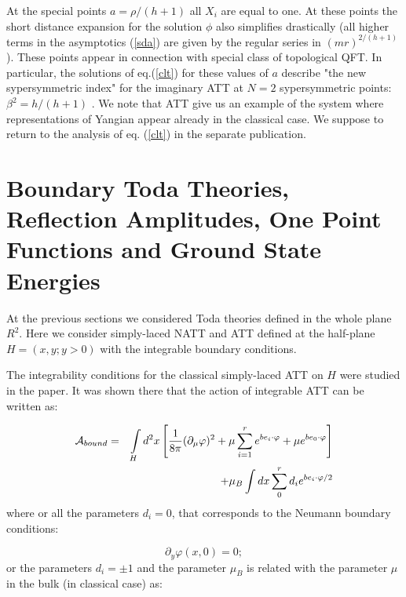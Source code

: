 \documentclass[a4paper,12pt]{article}
\begin{document}
At the special points $a=\rho /(h+1)$ all $X_i$ are equal to one. At these
points the short distance expansion for the solution $\phi $ also simplifies
drastically (all higher terms in the asymptotics (\ref{sda}) are given by
the regular series in $(mr)^{2/(h+1)}$). These points appear in connection
with special class of topological QFT. In particular, the solutions of 
eq.(\ref{clt}) for these values of $a$ describe "the new sypersymmetric index" 
\cite{CV} for the imaginary ATT at $N=2$ sypersymmetric points: $\beta
^2=h/(h+1)$ \cite{FLMW}. We note that ATT give us an example of the system 
where representations of Yangian appear already in the classical case. 
We suppose to return to the analysis of eq. 
(\ref{clt}) in the separate publication.

\section{Boundary Toda Theories, Reflection Amplitudes,
One Point Functions and Ground State Energies}

At the previous sections we considered Toda theories defined in the whole
plane $R^2$. Here we consider simply-laced NATT and ATT 
defined at the half-plane 
$H=(x,y;y>0)$ with the integrable boundary conditions.

The integrability
conditions for the classical simply-laced ATT on $H$ were studied in the
paper\cite{BCD}. It was shown there that the action of integrable ATT can be
written as:

\begin{eqnarray}
{\cal A}_{bound}&=&\int\limits_Hd^2x\left[ \frac 1{8\pi }(\partial _\mu
\varphi )^2+\mu \sum_{i=1}^re^{be_i\cdot \varphi }+\mu e^{be_0\cdot \varphi
}\right]
\nonumber \\
&&
 +\mu _B\int dx\sum\limits_0^rd_ie^{be_i\cdot\varphi /2}  \label{atb}
\end{eqnarray}
where or all the parameters $d_i=0$, that corresponds to the Neumann
boundary conditions:

\begin{equation}
\partial _y\varphi (x,0)=0;  \label{N}
\end{equation}
or the parameters $d_i=\pm 1$ and the parameter $\mu _B$ is related with the
parameter $\mu $ in the bulk (in classical case) as:
\end{document}
